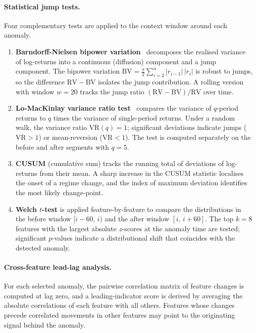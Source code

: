 \documentclass[11pt]{report}
\begin{document}
\paragraph{Statistical jump tests.}
Four complementary tests are applied to the context window around each anomaly.
\begin{enumerate}
    \item \textbf{Barndorff-Nielsen bipower variation}~\cite{Barndorff-Nielsen2004power} decomposes the realised variance of log-returns into a continuous (diffusion) component and a jump component. The bipower variation $\mathrm{BV} = \frac{\pi}{2} \sum_{i=2}^{n} |r_{i-1}| \, |r_i|$ is robust to jumps, so the difference $\mathrm{RV} - \mathrm{BV}$ isolates the jump contribution. A rolling version with window $w = 20$ tracks the jump ratio $(\mathrm{RV} - \mathrm{BV}) / \mathrm{RV}$ over time.

    \item \textbf{Lo-MacKinlay variance ratio test}~\cite{lo1988stock} compares the variance of $q$-period returns to $q$ times the variance of single-period returns. Under a random walk, the variance ratio $\mathrm{VR}(q) = 1$; significant deviations indicate jumps ($\mathrm{VR} > 1$) or mean-reversion ($\mathrm{VR} < 1$). The test is computed separately on the before and after segments with $q = 5$.

    \item \textbf{CUSUM} (cumulative sum) tracks the running total of deviations of log-returns from their mean. A sharp increase in the CUSUM statistic localises the onset of a regime change, and the index of maximum deviation identifies the most likely change-point.

    \item \textbf{Welch $t$-test} is applied feature-by-feature to compare the distributions in the before window $[i - 60,\, i)$ and the after window $[i,\, i + 60]$. The top $k = 8$ features with the largest absolute $z$-scores at the anomaly time are tested; significant $p$-values indicate a distributional shift that coincides with the detected anomaly.
\end{enumerate}

\paragraph{Cross-feature lead-lag analysis.}
For each selected anomaly, the pairwise correlation matrix of feature changes is computed at lag zero, and a leading-indicator score is derived by averaging the absolute correlations of each feature with all others. Features whose changes precede correlated movements in other features may point to the originating signal behind the anomaly.
\end{document}
